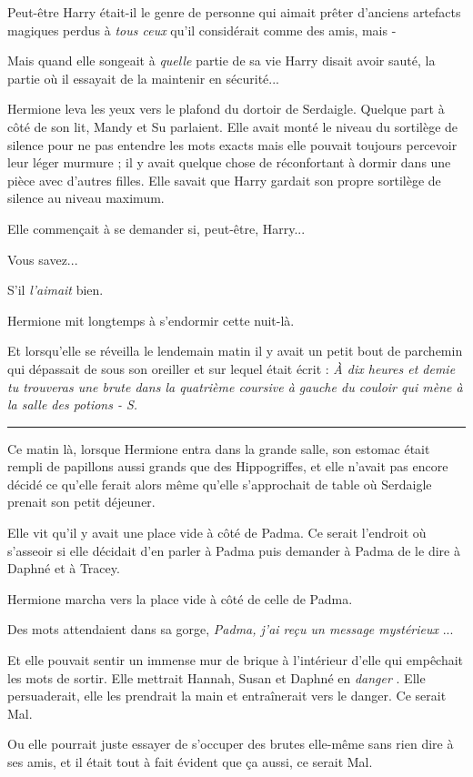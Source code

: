 Peut-être Harry était-il le genre de personne qui aimait prêter d'anciens artefacts magiques perdus à \emph{tous ceux}  qu'il considérait comme des amis, mais -

Mais quand elle songeait à \emph{quelle}  partie de sa vie Harry disait avoir sauté, la partie où il essayait de la maintenir en sécurité...

Hermione leva les yeux vers le plafond du dortoir de Serdaigle. Quelque part à côté de son lit, Mandy et Su parlaient. Elle avait monté le niveau du sortilège de silence pour ne pas entendre les mots exacts mais elle pouvait toujours percevoir leur léger murmure ; il y avait quelque chose de réconfortant à dormir dans une pièce avec d'autres filles. Elle savait que Harry gardait son propre sortilège de silence au niveau maximum.

Elle commençait à se demander si, peut-être, Harry...

Vous savez...

S'il \emph{l'aimait } bien.

Hermione mit longtemps à s'endormir cette nuit-là.

Et lorsqu'elle se réveilla le lendemain matin il y avait un petit bout de parchemin qui dépassait de sous son oreiller et sur lequel était écrit : \emph{À dix heures et demie tu trouveras une brute dans la quatrième coursive à gauche du couloir qui mène à la salle des potions - S.} 
\par\noindent\rule{\textwidth}{0.4pt}
Ce matin là, lorsque Hermione entra dans la grande salle, son estomac était rempli de papillons aussi grands que des Hippogriffes, et elle n'avait pas encore décidé ce qu'elle ferait alors même qu'elle s'approchait de table où Serdaigle prenait son petit déjeuner.

Elle vit qu'il y avait une place vide à côté de Padma. Ce serait l'endroit où s'asseoir si elle décidait d'en parler à Padma puis demander à Padma de le dire à Daphné et à Tracey.

Hermione marcha vers la place vide à côté de celle de Padma.

Des mots attendaient dans sa gorge, \emph{Padma, j'ai reçu un message mystérieux} ...

Et elle pouvait sentir un immense mur de brique à l'intérieur d'elle qui empêchait les mots de sortir. Elle mettrait Hannah, Susan et Daphné en \emph{danger} . Elle persuaderait, elle les prendrait la main et entraînerait vers le danger. Ce serait Mal.

Ou elle pourrait juste essayer de s'occuper des brutes elle-même sans rien dire à ses amis, et il était tout à fait évident que ça aussi, ce serait Mal.

